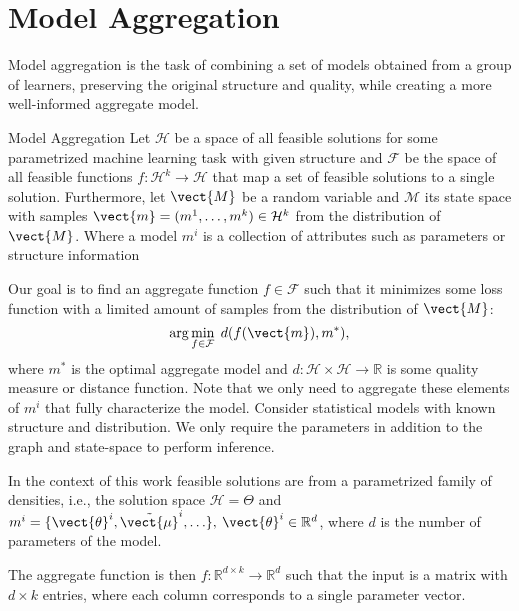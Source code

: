 
\chapter{Model Aggregation}
\label{chapter:ch3}
Model aggregation is the task of combining a set of models obtained from a group of learners, preserving the original structure and quality, while creating a more well-informed aggregate model.
\begin{definition}[parbox=false]{Model Aggregation}
    Let $\mathcal{H}$ be a space of all feasible solutions for some parametrized machine learning task with given structure and $\mathcal{F}$ be the space of all feasible functions $f: \mathcal{H}^k \rightarrow \mathcal{H}$ that map a set of feasible solutions to a single solution.
    Furthermore, let $\vect{M}$ be a random variable and $\mathcal{M}$ its state space with samples  $\vect{m} = (m^1, \ldots, m^k) \in \mathcal{H}^k$ from the distribution of $\vect{M}$.
    Where a model $m^i$ is a collection of attributes such as parameters or structure information

    Our goal is to find an aggregate function $f \in \mathcal{F}$ such that it minimizes some loss function with a limited amount of samples from the distribution of $\vect{M}$:
    \begin{equation}
        \label{eq:regret}
        \arg\min_{f \in \mathcal{F}} \; d(f(\vect{m}), m^*),
    \end{equation}
    where $m^*$ is the optimal aggregate model and $d: \mathcal{H} \times \mathcal{H} \rightarrow \mathbb{R}$ is some quality measure or distance function.
    Note that we only need to aggregate these elements of $m^i$ that fully characterize the model.
    Consider statistical models with known structure and distribution. 
    We only require the parameters in addition to the graph and state-space to perform inference.
\end{definition}

In the context of this work feasible solutions are from a parametrized family of densities, i.e., the solution space $\mathcal{H} = \Theta$ and  $m^i = \{\vect{\theta}^i, \tilde{\vect{\mu}}^i, \ldots\}, \: \vect{\theta}^i \in \mathbb{R}^d$, where $d$ is the number of parameters of the model. 

The aggregate function is then $f: \mathbb{R}^{d \times k} \rightarrow \mathbb{R}^{d}$ such that the input is a matrix with $d \times k$ entries, where each column corresponds to a single parameter vector.

